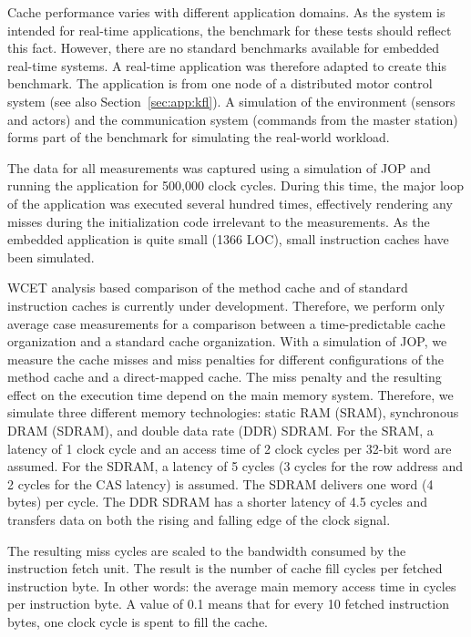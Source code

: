 Cache performance varies with different application domains. As the
system is intended for real-time applications, the benchmark for
these tests should reflect this fact. However, there are no standard
benchmarks available for embedded real-time systems. A real-time
application was therefore adapted to create this benchmark. The
application is from one node of a distributed motor control system
\cite{jop:wises03} (see also Section~\ref{sec:app:kfl}). A simulation
of the environment (sensors and actors) and the communication system
(commands from the master station) forms part of the benchmark for
simulating the real-world workload.

The data for all measurements was captured using a simulation of JOP
and running the application for 500,000 clock cycles. During this
time, the major loop of the application was executed several hundred
times, effectively rendering any misses during the initialization
code irrelevant to the measurements. As the embedded application is
quite small (1366 LOC), small instruction caches have been simulated.

WCET analysis based comparison of the method cache and of standard
instruction caches is currently under development. Therefore, we
perform only average case measurements for a comparison between a
time-predictable cache organization and a standard cache
organization. With a simulation of JOP, we measure the cache misses
and miss penalties for different configurations of the method cache
and a direct-mapped cache. The miss penalty and the resulting effect
on the execution time depend on the main memory system. Therefore, we
simulate three different memory technologies: static RAM (SRAM),
synchronous DRAM (SDRAM), and double data rate (DDR) SDRAM. For the
SRAM, a latency of 1 clock cycle and an access time of 2 clock cycles
per 32-bit word are assumed. For the SDRAM, a latency of 5 cycles (3
cycles for the row address and 2 cycles for the CAS latency) is
assumed. The SDRAM delivers one word (4 bytes) per cycle. The DDR
SDRAM has a shorter latency of 4.5 cycles and transfers data on both
the rising and falling edge of the clock signal.

The resulting miss cycles are scaled to the bandwidth consumed by the
instruction fetch unit. The result is the number of cache fill cycles
per fetched instruction byte. In other words: the average main memory
access time in cycles per instruction byte. A value of 0.1 means that
for every 10 fetched instruction bytes, one clock cycle is spent to
fill the cache.

